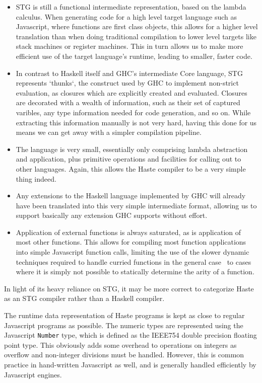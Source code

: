 \documentclass[preprint]{sigplanconf}
\begin{document}
\begin{itemize}
  \item STG is still a functional intermediate representation, based on the
        lambda calculus. When generating code for a high level target language
        such as Javascript, where functions are first class objects, this
        allows for a higher level translation than when doing traditional
        compilation to lower level targets like stack machines or register
        machines. This in turn allows us to make more efficient use of the
        target language's runtime, leading to smaller, faster code.
  \item In contrast to Haskell itself and GHC's intermediate Core language, STG
        represents `thunks`, the construct used by GHC to implement non-strict
        evaluation, as closures which are explicitly created and evaluated.
        Closures are decorated with a wealth of information, such as their set
        of captured varibles, any type information needed for code generation,
        and so on. While extracting this information manually is not very hard,
        having this done for us means we can get away with a simpler
        compilation pipeline.
  \item The language is very small, essentially only comprising lambda
        abstraction and application, plus primitive operations and facilities
        for calling out to other languages. Again, this allows the Haste
        compiler to be a very simple thing indeed.
  \item Any extensions to the Haskell language implemented by GHC will already
        have been translated into this very simple intermediate format,
        allowing us to support basically any extension GHC supports without
        effort.
  \item Application of external functions is always saturated, as is
        application of most other functions. This allows for compiling most
        function applications into simple Javascript function calls, limiting
        the use of the slower dynamic techniques required to handle curried
        functions in the general case\ \cite{fastcurry} to cases where it is
        simply not possible to statically determine the arity of a function.
\end{itemize}

In light of its heavy reliance on STG, it may be more correct to categorize
Haste as an STG compiler rather than a Haskell compiler.

The runtime data representation of Haste programs is kept as close to regular
Javascript programs as possible. The numeric types are represented using the
Javascript \lstinline!Number! type, which is defined as the IEEE754 double
precision floating point type. This obviously adds some overhead to operations
on integers as overflow and non-integer divisions must be handled. However, this
is common practice in hand-written Javascript as well, and is generally handled
efficiently by Javascript engines.
\end{document}
